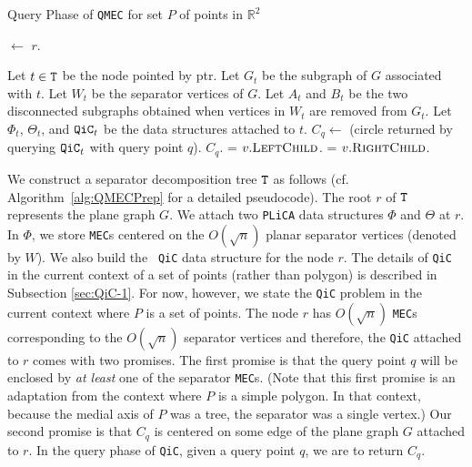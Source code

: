 \documentclass[12pt]{llncs}
\begin{document}
\begin{algorithm}[h!]
\caption{Query Phase of {\tt QMEC} for set $P$ of points in $\mathbb{R}^2$}
\label{alg:QMECQuery}
\begin{algorithmic}[1]

 $\leftarrow$ $r$.

\STATE Let $t \in {\tt T}$ be the node pointed by {\sc ptr}.
\STATE Let $G_t$ be the subgraph of $G$ associated with $t$.
\STATE Let $W_t$ be the separator vertices of $G$.
\STATE Let $A_t$ and $B_t$ be the two disconnected subgraphs obtained when vertices in $W_t$ are removed from $G_t$.
\STATE Let $\Phi_t$, $\Theta_t$, and ${\tt QiC}_t$ be the data structures attached to $t$.
\STATE $C_q \leftarrow$ (circle returned by querying ${\tt QiC}_t$ with query point $q$).
\RETURN $C_q$.
\ENDIF
{}
 = $v.\textsc{LeftChild}$.
\ELSE
{} = $v.\textsc{RightChild}$.
\ENDIF
\ENDWHILE
\STATE {}

\end{algorithmic}
\end{algorithm}

We construct a separator decomposition tree ${\tt T}$ as follows (cf. Algorithm\ \ref{alg:QMECPrep} for a detailed pseudocode). The root $r$ of 
${\tt T}$ represents the plane graph $G$. We  attach two {\tt PLiCA} data structures 
$\Phi$ and $\Theta$ at $r$. In $\Phi$, we store {\tt MEC}s centered on the 
$O(\sqrt{n})$ planar separator vertices (denoted by $W$). We also build the {\tt 
QiC} data structure for the node $r$. The details of {\tt QiC} in the current context of a set of points (rather than polygon)  is described in Subsection \ref{sec:QiC-1}. For now, however, we state the {\tt QiC} problem in the current context where $P$ is a set of points. The node $r$ has $O(\sqrt{n})$ {\tt MEC}s corresponding to the $O(\sqrt{n})$ separator vertices and therefore, the {\tt QiC} attached to $r$ comes with two promises. The first promise is  that the query point $q$ will be enclosed by \textit{at least} one of the separator {\tt MEC}s. (Note that this first promise is an adaptation from the context where $P$ is a simple polygon. In that context, because the medial axis of $P$ was a tree, the separator was  a single vertex.) Our second promise is that $C_q$ is centered on some edge of the plane graph $G$ attached to $r$. In the query phase of {\tt QiC}, given a query point $q$, we are to return $C_q$. 
\end{document}
